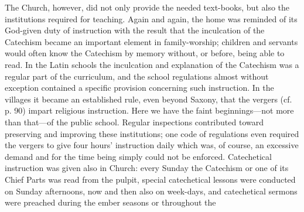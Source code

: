 The Church, however, did not only provide the needed text-books, but also the institutions required for teaching. Again and again, the home was reminded of its God-given duty of instruction with the result that the inculcation of the Catechism became an important element in family-worship; children and servants would often know the Catechism by memory without, or before, being able to read. In the Latin schools the inculcation and explanation of the Catechism was a regular part of the curriculum, and the school regulations almost without exception contained a specific provision concerning such instruction. In the villages it became an established rule, even beyond Saxony, that the vergers (cf. p. 90) impart religious instruction. Here we have the faint beginnings—not more than that—of the public school. Regular inspections contributed toward preserving and improving these institutions; one code of regulations even required the vergers to give four hours’ instruction daily which was, of course, an excessive demand and for the time being simply could not be enforced. Catechetical instruction was given also in Church: every Sunday the Catechism or one of its Chief Parts was read from the pulpit, special catechetical lessons were conducted on Sunday afternoons, now and then also on week-days, and catechetical sermons were preached during the ember seasons or throughout the
